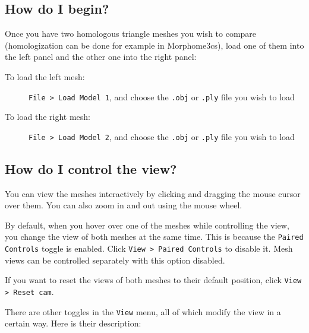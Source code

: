 
\subsection{How do I begin?}

Once you have two homologous triangle meshes you wish to compare (homologization can be done for example in Morphome3cs), load one of them into the left panel and the other one into the right panel:

\begin{description}
\item [To load the left mesh:] \verb+File > Load Model 1+, and choose the \verb+.obj+ or \verb+.ply+ file you wish to load
\item [To load the right mesh:] \verb+File > Load Model 2+, and choose the \verb+.obj+ or \verb+.ply+ file you wish to load
\end{description}

\subsection{How do I control the view?}

You can view the meshes interactively by clicking and dragging the mouse cursor over them. You can also zoom in and out using the mouse wheel.

By default, when you hover over one of the meshes while controlling the view, you change the view of both meshes at the same time. This is because the \verb+Paired Controls+ toggle is enabled. Click \verb+View > Paired Controls+ to disable it. Mesh views can be controlled separately with this option disabled.

If you want to reset the views of both meshes to their default position, click \verb+View > Reset cam+.

There are other toggles in the \verb+View+ menu, all of which modify the view in a certain way. Here is their description:

